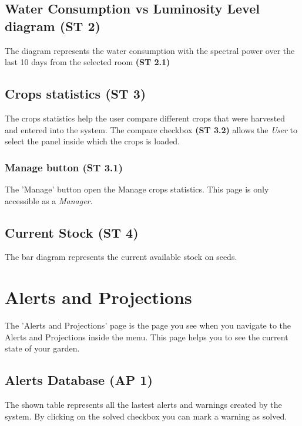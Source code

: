 \subsection{Water Consumption vs Luminosity Level diagram (ST 2)}
The diagram represents the water consumption with the spectral power over 
the last 10 days from the selected room \textbf{(ST 2.1)}

\subsection{Crops statistics (ST 3)}
The crops statistics help the user compare different crops that were harvested and entered into the system.
The compare checkbox \textbf{(ST 3.2)} allows the \emph{User} to select the
panel inside which the crops is loaded.

\subsubsection{Manage button (ST 3.1)}
The 'Manage' button open the Manage crops statistics. This page is only accessible as a \emph{Manager}.


\subsection{Current Stock (ST 4)}
The bar diagram represents the current available stock on seeds.





\newpage
\section{Alerts and Projections}
\label{sec:appendix_AlertsPrejections}
\mbox{} \par
\noindent{}

The 'Alerts and Projections' page is the  page you see when you navigate to the
Alerts and Projections inside the menu. This page helps you to see the current
state of your garden.

\subsection{Alerts Database (AP 1)}
The shown table represents all the lastest alerts and warnings created by the
system. By clicking on the solved checkbox you can mark a warning as solved.

